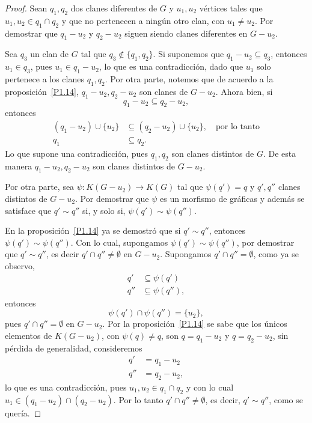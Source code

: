 \documentclass[12pt]{book}
\theoremstyle{definition}
\begin{document}
\begin{proof}
Sean $q_1,q_2$ dos clanes diferentes de $G$ y $u_1,u_2$ vértices tales que $u_1,u_2\in q_1\cap q_2$ y que no pertenecen a ningún otro clan, con $u_1\neq u_2$. Por demostrar que $q_1-u_2$ y $q_2-u_2$ siguen siendo clanes diferentes en $G-u_2$.

Sea $q_3$ un clan de $G$ tal que $q_3\notin \{q_1,q_2\}$. Si suponemos que $q_1-u_2\subseteq q_3$, entonces $u_1\in q_3$, pues $u_1 \in q_1-u_2$, lo que es una contradicción, dado que $u_1$ solo pertenece a los clanes $q_1,q_2$. Por otra parte, notemos que de acuerdo a la proposición~\ref{P1.14}, $q_1-u_2,q_2-u_2$ son clanes de $G-u_2$. Ahora bien, si 
\begin{equation*}
q_1-u_2\subseteq q_2-u_2,
\end{equation*}
entonces 
\begin{equation*}
\begin{aligned}
(q_1-u_2)\cup\{u_2\} &\subseteq (q_2-u_2)\cup\{u_2\},\quad\text{por lo tanto} \\
q_1 &\subseteq q_2.
\end{aligned}
\end{equation*}
Lo que supone una contradicción, pues $q_1,q_2$ son clanes distintos de $G$. De esta manera $q_1-u_2,q_2-u_2$ son clanes distintos de $G-u_2$.

Por otra parte, sea $\psi:K(G-u_2)\to K(G)$ tal que $\psi(q')=q$ y $q',q''$ clanes distintos de $G-u_2$. Por demostrar que $\psi$ es un morfismo de gráficas y además se satisface que $q'\sim q''$ si, y solo si, $\psi(q')\sim\psi(q'')$.

En la proposición~\ref{P1.14} ya se demostró que si $q'\sim q''$, entonces $\psi(q')\sim\psi(q'')$. Con lo cual, supongamos $\psi(q')\sim\psi(q'')$, por demostrar que $q'\sim q''$, es decir $q'\cap q''\neq\emptyset$ en $G-u_2$. Supongamos $q'\cap q''=\emptyset$, como ya se observo,
\begin{equation*}
\begin{aligned}
q' &\subseteq \psi(q') \\
q'' &\subseteq \psi(q''),
\end{aligned}
\end{equation*}
entonces
\begin{equation*}
\psi(q')\cap \psi(q'')=\{u_2\},
\end{equation*}
pues $q'\cap q''=\emptyset$ en $G-u_2$. Por la proposición~\ref{P1.14} se sabe que los únicos elementos de $K(G-u_2)$, con $\psi(q)\neq q$, son $q=q_1-u_2$ y $q=q_2-u_2$, sin pérdida de generalidad, consideremos 
\begin{equation*}
\begin{aligned}
q' &= q_1-u_2 \\
q'' &= q_2-u_2,
\end{aligned}
\end{equation*}
lo que es una contradicción, pues $u_1,u_2\in q_1\cap q_2$ y con lo cual $u_1\in (q_1-u_2)\cap (q_2-u_2)$. Por lo tanto $q'\cap q''\neq\emptyset$, es decir, $q'\sim q''$, como se quería.


\end{proof}
\end{document}
